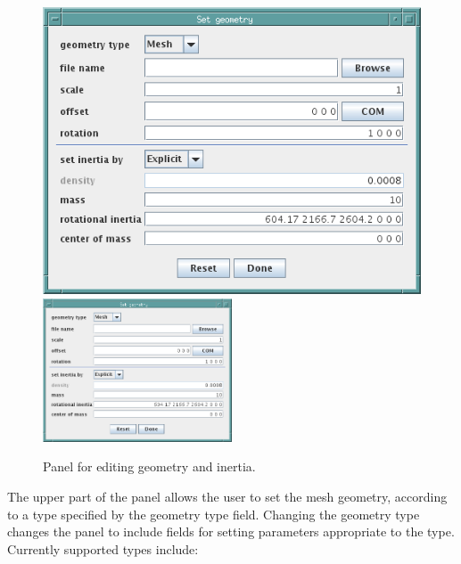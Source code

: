\documentclass{article}
\begin{document}
\begin{figure}
\begin{center}
\iflatexml
\includegraphics[]{images/geometryAndInertiaPanel}
\else
\includegraphics[width=0.50\textwidth]{images/geometryAndInertiaPanel}
\fi
\end{center}
\caption{Panel for editing geometry and inertia.}%
\label{geometryAndInertiaPanelFig}
\end{figure}

The upper part of the panel allows the user to set the mesh geometry,
according to a type specified by the {\sf geometry type} field. Changing
the geometry type changes the panel to include fields for setting
parameters appropriate to the type. Currently supported types include:
\end{document}
